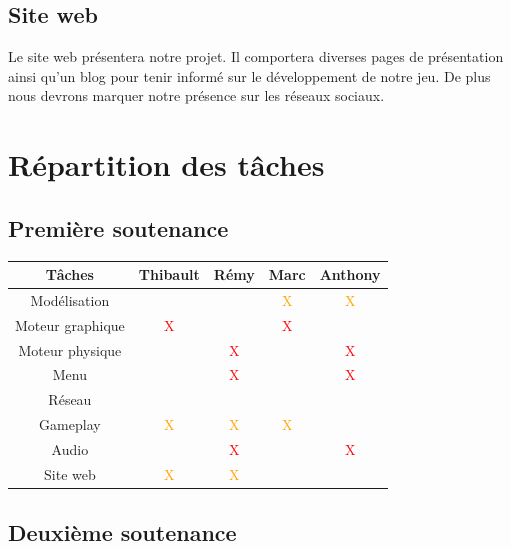 \documentclass[a4paper, 11pt]{report}
\begin{document}
\subsection{Site web}\label{site-web}

Le site web présentera notre projet. Il comportera diverses pages de présentation ainsi qu'un blog pour tenir informé sur le développement de notre jeu. De plus nous devrons marquer notre présence sur les réseaux sociaux.

\newpage
\section{Répartition des tâches}\label{repartition-des-tuxe2ches}

\subsection{Première soutenance}\label{premiuxe8re-soutenance}

\begin{tabular}{ | c || c | c | c | c | }
\hline Tâches & Thibault & Rémy & Marc & Anthony \\
\hline Modélisation & & & \textcolor{orange}{X} & \textcolor{orange}{X} \\
\hline Moteur graphique & \textcolor{red}{X} & & \textcolor{red}{X} & \\
\hline Moteur physique & & \textcolor{red}{X} & & \textcolor{red}{X} \\
\hline Menu & & \textcolor{red}{X} & & \textcolor{red}{X} \\
\hline Réseau & & & & \\
\hline Gameplay & \textcolor{orange}{X} & \textcolor{orange}{X} & \textcolor{orange}{X} & \\
\hline Audio & & \textcolor{red}{X} & & \textcolor{red}{X} \\
\hline Site web & \textcolor{orange}{X} & \textcolor{orange}{X} & & \\
\hline
\end{tabular}

\subsection{Deuxième soutenance}\label{deuxiuxe8me-soutenance}
\end{document}
